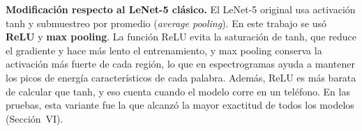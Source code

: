 \documentclass[conference]{IEEEtran}
\begin{document}
\begin{table}[htbp]
\caption{Dimensiones del Modelo A (LeNet-5)}
\label{tab:lenet}
\centering
{}
\end{table}

\textbf{Modificación respecto al LeNet-5 clásico.} El LeNet-5 original usa activación tanh y submuestreo por promedio (\textit{average pooling}). En este trabajo se usó \textbf{ReLU} y \textbf{max pooling}. La función ReLU evita la saturación de tanh, que reduce el gradiente y hace más lento el entrenamiento, y max pooling conserva la activación más fuerte de cada región, lo que en espectrogramas ayuda a mantener los picos de energía característicos de cada palabra. Además, ReLU es más barata de calcular que tanh, y eso cuenta cuando el modelo corre en un teléfono. En las pruebas, esta variante fue la que alcanzó la mayor exactitud de todos los modelos (Sección~VI).
\end{document}

